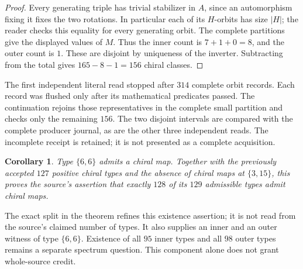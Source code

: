 \documentclass[11pt]{article}
\newtheorem{corollary}[theorem]{Corollary}
\begin{document}
\begin{proof}
Every generating triple has trivial stabilizer in $A$, since an
automorphism fixing it fixes the two rotations. In particular each
of its $H$-orbits has size $|H|$; the reader checks this equality for
every generating orbit. The complete partitions give the displayed
values of $M$. Thus the inner count is $7+1+0=8$, and the outer count
is $1$. These are disjoint by uniqueness of the inverter. Subtracting
from the total gives $165-8-1=156$ chiral classes.
\end{proof}

The first independent literal read stopped after $314$ complete orbit
records. Each record was flushed only after its mathematical predicates
passed. The continuation rejoins those representatives in the complete
small partition and checks only the remaining $156$. The two disjoint
intervals are compared with the complete producer journal, as are the
other three independent reads. The incomplete receipt is retained;
it is not presented as a complete acquisition.

\begin{corollary}
Type $\{6,6\}$ admits a chiral map. Together with the previously
accepted $127$ positive chiral types and the absence of chiral maps at
$\{3,15\}$, this proves the source's assertion that exactly $128$
of its $129$ admissible types admit chiral maps.
\end{corollary}

The exact split in the theorem refines this existence assertion; it is
not read from the source's claimed number of types. It also supplies
an inner and an outer witness of type $\{6,6\}$. Existence of all
$95$ inner types and all $98$ outer types remains a separate spectrum
question. This component alone does not grant whole-source credit.
\end{document}
